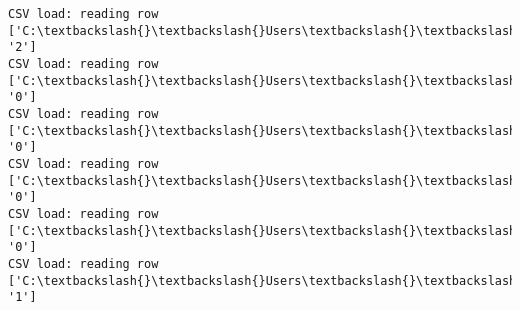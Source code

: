 \documentclass[11pt]{article}
\begin{document}
\begin{Verbatim}[commandchars=\\\{\}]
CSV load: reading row ['C:\textbackslash{}\textbackslash{}Users\textbackslash{}\textbackslash{}AbhishekGangadhar\textbackslash{}\textbackslash{}Downloads\textbackslash{}\textbackslash{}ActionRecog\textbackslash{}\textbackslash{}ActionRecog\textbackslash{}\textbackslash{}DataSets\textbackslash{}\textbackslash{}UCF11\textbackslash{}\textbackslash{}action\_youtube\_naudio\textbackslash{}\textbackslash{}trampoline\_jumping\textbackslash{}\textbackslash{}v\_jumping\_13\textbackslash{}\textbackslash{}v\_jumping\_13\_04.avi', '2']
CSV load: reading row ['C:\textbackslash{}\textbackslash{}Users\textbackslash{}\textbackslash{}AbhishekGangadhar\textbackslash{}\textbackslash{}Downloads\textbackslash{}\textbackslash{}ActionRecog\textbackslash{}\textbackslash{}ActionRecog\textbackslash{}\textbackslash{}DataSets\textbackslash{}\textbackslash{}UCF11\textbackslash{}\textbackslash{}action\_youtube\_naudio\textbackslash{}\textbackslash{}biking\textbackslash{}\textbackslash{}v\_biking\_12\textbackslash{}\textbackslash{}v\_biking\_12\_01.avi', '0']
CSV load: reading row ['C:\textbackslash{}\textbackslash{}Users\textbackslash{}\textbackslash{}AbhishekGangadhar\textbackslash{}\textbackslash{}Downloads\textbackslash{}\textbackslash{}ActionRecog\textbackslash{}\textbackslash{}ActionRecog\textbackslash{}\textbackslash{}DataSets\textbackslash{}\textbackslash{}UCF11\textbackslash{}\textbackslash{}action\_youtube\_naudio\textbackslash{}\textbackslash{}biking\textbackslash{}\textbackslash{}v\_biking\_12\textbackslash{}\textbackslash{}v\_biking\_12\_02.avi', '0']
CSV load: reading row ['C:\textbackslash{}\textbackslash{}Users\textbackslash{}\textbackslash{}AbhishekGangadhar\textbackslash{}\textbackslash{}Downloads\textbackslash{}\textbackslash{}ActionRecog\textbackslash{}\textbackslash{}ActionRecog\textbackslash{}\textbackslash{}DataSets\textbackslash{}\textbackslash{}UCF11\textbackslash{}\textbackslash{}action\_youtube\_naudio\textbackslash{}\textbackslash{}biking\textbackslash{}\textbackslash{}v\_biking\_12\textbackslash{}\textbackslash{}v\_biking\_12\_03.avi', '0']
CSV load: reading row ['C:\textbackslash{}\textbackslash{}Users\textbackslash{}\textbackslash{}AbhishekGangadhar\textbackslash{}\textbackslash{}Downloads\textbackslash{}\textbackslash{}ActionRecog\textbackslash{}\textbackslash{}ActionRecog\textbackslash{}\textbackslash{}DataSets\textbackslash{}\textbackslash{}UCF11\textbackslash{}\textbackslash{}action\_youtube\_naudio\textbackslash{}\textbackslash{}biking\textbackslash{}\textbackslash{}v\_biking\_12\textbackslash{}\textbackslash{}v\_biking\_12\_04.avi', '0']
CSV load: reading row ['C:\textbackslash{}\textbackslash{}Users\textbackslash{}\textbackslash{}AbhishekGangadhar\textbackslash{}\textbackslash{}Downloads\textbackslash{}\textbackslash{}ActionRecog\textbackslash{}\textbackslash{}ActionRecog\textbackslash{}\textbackslash{}DataSets\textbackslash{}\textbackslash{}UCF11\textbackslash{}\textbackslash{}action\_youtube\_naudio\textbackslash{}\textbackslash{}golf\_swing\textbackslash{}\textbackslash{}v\_golf\_06\textbackslash{}\textbackslash{}v\_golf\_06\_01.avi', '1']

\end{Verbatim}
\end{document}
